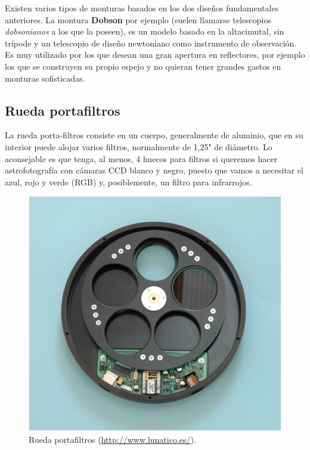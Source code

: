 \bigskip
Existen varios tipos de monturas basados en los dos diseños fundamentales anteriores. La montura \textbf{Dobson} por ejemplo (suelen llamarse telescopios \textit{dobsonianos} a los que la poseen), es un modelo basado en la altacimutal, sin trípode y un telescopio de diseño newtoniano como instrumento de observación. Es muy utilizado por los que desean una gran apertura en reflectores, por ejemplo los que se construyen su propio espejo y no quieran tener grandes gastos en monturas sofisticadas.

\subsection{Rueda portafiltros}

La rueda porta-filtros consiste en un cuerpo, generalmente de aluminio, que en su interior puede alojar varios filtros, normalmente de 1,25" de diámetro. Lo aconsejable es que tenga, al menos, 4 huecos para filtros si queremos hacer astrofotografía con cámaras CCD blanco y negro, puesto que vamos a necesitar el azul, rojo y verde (RGB) y, posiblemente, un filtro para infrarrojos.

\bigskip
\begin{figure}[!ht]
  \begin{center}
  \includegraphics[width=1\textwidth]{../images/portafiltros.jpg}
  \caption{Rueda portafiltros (\url{http://www.lunatico.es/}).}
  \label{fig:diag_scrum}
  \end{center}
\end{figure}

